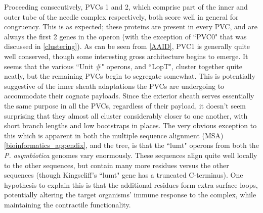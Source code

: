 Proceeding consecutively, PVCs 1 and 2, which comprise part of the inner and outer tube of the needle complex respectively, both score well in general for congruency. This is as expected; these proteins are present in every PVC, and are always the first 2 genes in the operon (with the exception of ``PVC0" that was discussed in \vref{clustering}). As can be seen from \vref{AAID}, PVC1 is generally quite well conserved, though some interesting gross architecture begins to emerge. It seems that the various ``Unit \#" operons, and ``LopT", cluster together quite neatly, but the remaining PVCs begin to segregate somewhat. This is potentially suggestive of the inner sheath adaptations the PVCs are undergoing to accommodate their cognate payloads. Since the exterior sheath serves essentially the same purpose in all the PVCs, regardless of their payload, it doesn't seem surprising that they almost all cluster considerably closer to one another, with short branch lengths and low bootstraps in places. The very obvious exception to this which is apparent in both the multiple sequence alignment (MSA) \vref{bioinformatics_appendix}, and the tree, is that the ``lumt" operons from both the \emph{P. asymbiotica} genomes vary enormously. These sequences align quite well locally to the other sequences, but contain many more residues versus the other sequences (though Kingscliff's ``lumt" gene has a truncated C-terminus). One hypothesis to explain this is that the additional residues form extra surface loops, potentially altering the target organisms' immune response to the complex, while maintaining the contractile functionality.

